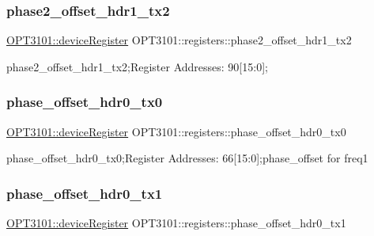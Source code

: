 \subsubsection{\texorpdfstring{phase2\+\_\+offset\+\_\+hdr1\+\_\+tx2}{phase2\_offset\_hdr1\_tx2}}
{\footnotesize\ttfamily \mbox{\hyperlink{class_o_p_t3101_1_1device_register}{O\+P\+T3101\+::device\+Register}} O\+P\+T3101\+::registers\+::phase2\+\_\+offset\+\_\+hdr1\+\_\+tx2}



phase2\+\_\+offset\+\_\+hdr1\+\_\+tx2;Register Addresses\+: 90\mbox{[}15\+:0\mbox{]}; 

\mbox{\label{class_o_p_t3101_1_1registers_af079839b4c86061e23aeec6d3dd1727b}} 
\subsubsection{\texorpdfstring{phase\+\_\+offset\+\_\+hdr0\+\_\+tx0}{phase\_offset\_hdr0\_tx0}}
{\footnotesize\ttfamily \mbox{\hyperlink{class_o_p_t3101_1_1device_register}{O\+P\+T3101\+::device\+Register}} O\+P\+T3101\+::registers\+::phase\+\_\+offset\+\_\+hdr0\+\_\+tx0}



phase\+\_\+offset\+\_\+hdr0\+\_\+tx0;Register Addresses\+: 66\mbox{[}15\+:0\mbox{]};phase\+\_\+offset for freq1 

\mbox{\label{class_o_p_t3101_1_1registers_a4097670bfd34c50f64b7644626bb3390}} 
\subsubsection{\texorpdfstring{phase\+\_\+offset\+\_\+hdr0\+\_\+tx1}{phase\_offset\_hdr0\_tx1}}
{\footnotesize\ttfamily \mbox{\hyperlink{class_o_p_t3101_1_1device_register}{O\+P\+T3101\+::device\+Register}} O\+P\+T3101\+::registers\+::phase\+\_\+offset\+\_\+hdr0\+\_\+tx1}



